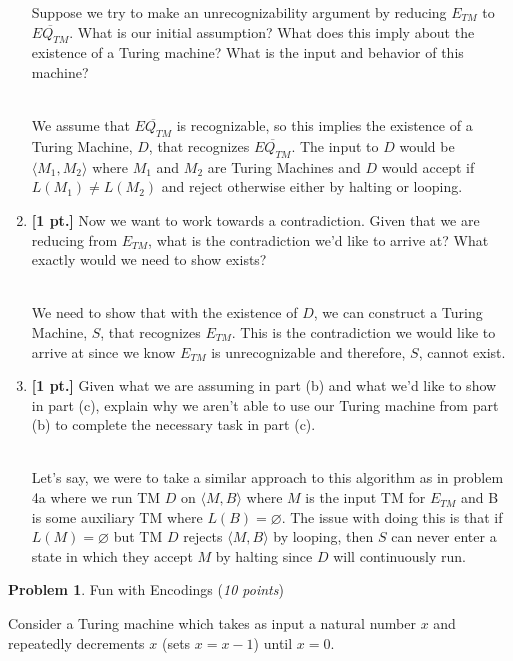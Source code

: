 \documentclass[11pt]{article}
\theoremstyle{definition}
\theoremstyle{theorem}
\newtheorem{prob}{Problem}
\newcommand{\solution}{\medskip\noindent{\color{blue}\textbf{Solution:}}}
\begin{document}
\begin{enumerate}[label=(\alph*)]
Suppose we try to make an unrecognizability argument by reducing $E_{TM}$ to $\overline{EQ_{TM}}$.
What is our initial assumption? What does this imply about the existence of a Turing machine? What is the input and behavior of this machine?

\solution \\
We assume that $\overline{EQ_{TM}}$ is recognizable, so this implies the existence of a Turing Machine, $D$, that recognizes $\overline{EQ_{TM}}$. The input to $D$ would be $\langle M_1, M_2 \rangle$ where $M_1$ and $M_2$ are Turing Machines and $D$ would accept if $L(M_1) \neq L(M_2)$ and reject otherwise either by halting or looping.


\item \textbf{[1 pt.]} Now we want to work towards a contradiction. Given that we are reducing from $E_{TM}$, what is the contradiction we'd like to arrive at? What exactly would we need to show exists?

\solution \\
We need to show that with the existence of $D$, we can construct a Turing Machine, $S$, that recognizes $E_{TM}$. This is the contradiction we would like to arrive at since we know $E_{TM}$ is unrecognizable and therefore, $S$, cannot exist. 



\item \textbf{[1 pt.]} Given what we are assuming in part (b) and what we'd like to show in part (c), explain why we aren't able to use our Turing machine from part (b) to complete the necessary task in part (c). 

\solution\\
Let's say, we were to take a similar approach to this algorithm as in problem 4a where we run TM $D$ on $\langle M, B \rangle$ where $M$ is the input TM for $E_{TM}$ and B is some auxiliary TM where $L(B) = \varnothing$. The issue with doing this is that if $L(M) = \varnothing$ but TM $D$ rejects $\langle M, B \rangle$ by looping, then $S$ can never enter a state in which they accept $M$ by halting since $D$ will continuously run. 



\end{enumerate}

\newpage

\begin{prob} Fun with Encodings (\emph{10 points})\end{prob}

Consider a Turing machine which takes as input a natural number $x$ and repeatedly decrements $x$ (sets $x=x-1$) until $x=0$. 
\end{document}
